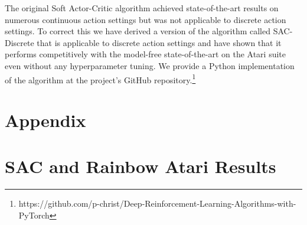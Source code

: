 \documentclass{article}
\begin{document}
The original Soft Actor-Critic algorithm achieved state-of-the-art results on numerous continuous action settings but was not applicable to discrete action settings. To correct this we have derived a version of the algorithm called SAC-Discrete that is applicable to discrete action settings and have shown that it performs competitively with the model-free state-of-the-art on the Atari suite even without any hyperparameter tuning. We provide a Python implementation of the algorithm at the project's GitHub repository.\footnote{https://github.com/p-christ/Deep-Reinforcement-Learning-Algorithms-with-PyTorch}   

\printbibliography
\clearpage

\section*{Appendix}
\appendix

\section{SAC and Rainbow Atari Results}
\label{sac_results}
\end{document}
